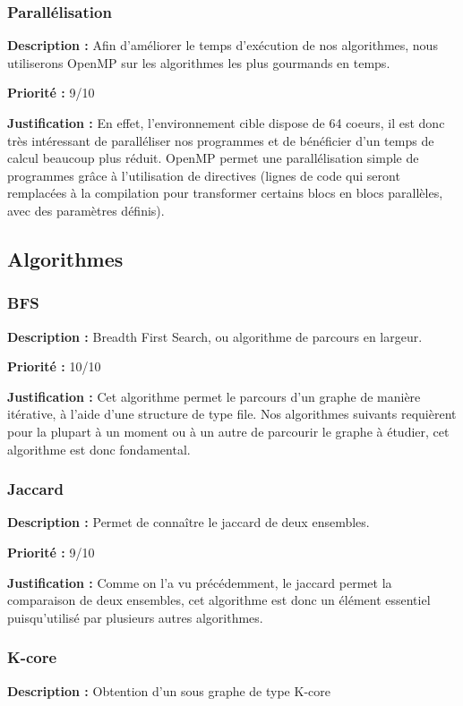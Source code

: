 \begin{titlepage}
\subsubsection{Parallélisation}
{
\textbf{Description :} Afin d'améliorer le temps d'exécution de nos algorithmes, nous utiliserons OpenMP \cite{OpenMP}  sur les algorithmes les plus gourmands en temps.

\textbf{Priorité :} 9/10

\textbf{Justification :} En effet, l'environnement cible dispose de 64 coeurs, il est donc très intéressant de paralléliser nos programmes et de bénéficier d'un temps de calcul beaucoup plus réduit. OpenMP \cite{OpenMP} permet une parallélisation simple de programmes grâce à l'utilisation de directives (lignes de code qui seront remplacées à la compilation pour transformer certains blocs en blocs parallèles, avec des paramètres définis).
}

\subsection{Algorithmes}

\subsubsection{BFS}
{
\textbf{Description :} Breadth First Search, ou algorithme de parcours en largeur. \cite{BFS}

\textbf{Priorité :} 10/10

\textbf{Justification :} Cet algorithme permet le parcours d'un graphe de manière itérative, à l'aide d'une structure de type file. Nos algorithmes suivants requièrent pour la plupart à un moment ou à un autre de parcourir le graphe à étudier, cet algorithme est donc fondamental.
}

\subsubsection{Jaccard}
{
\textbf{Description :} Permet de connaître le jaccard \cite{jaccard} de deux ensembles.

\textbf{Priorité :} 9/10

\textbf{Justification :} Comme on l'a vu précédemment, le jaccard permet la comparaison de deux ensembles, cet algorithme est donc un élément essentiel puisqu'utilisé par plusieurs autres algorithmes.
}

\subsubsection{K-core}
{
\textbf{Description :} Obtention d'un sous graphe de type K-core

}
\end{titlepage}
